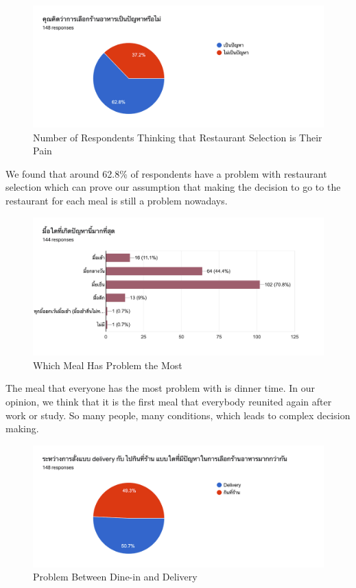 \documentclass[12pt,oneside,openright,a4paper]{cpe-english-project}
\begin{document}
\begin{figure}[H]\centering
\includegraphics[width=350pt]{./images/A1NumberofRespondentsThinkingthatRestaurantSelectionisTheirPain.png}
\caption{Number of Respondents Thinking that Restaurant Selection is Their Pain}\label{fig:A1NumberofRespondentsThinkingthatRestaurantSelectionisTheirPain}
\end{figure}\vspace{-24pt}

We found that around 62.8\% of respondents have a problem with restaurant selection which can prove our assumption that making the decision to go to the restaurant for each meal is still a problem nowadays.

\begin{figure}[H]\centering
\includegraphics[width=350pt]{./images/A1WhichMealHasProblemtheMost.png}
\caption{Which Meal Has Problem the Most}\label{fig:A1WhichMealHasProblemtheMost}
\end{figure}\vspace{-24pt}

The meal that everyone has the most problem with is dinner time. In our opinion, we think that it is the first meal that everybody reunited again after work or study. So many people, many conditions, which leads to complex decision making.

\begin{figure}[H]\centering
\includegraphics[width=350pt]{./images/A1ProblemBetweenDine-inandDelivery.png}
\caption{Problem Between Dine-in and Delivery}\label{fig:A1ProblemBetweenDine-inandDelivery}
\end{figure}\vspace{-24pt}
\end{document}
